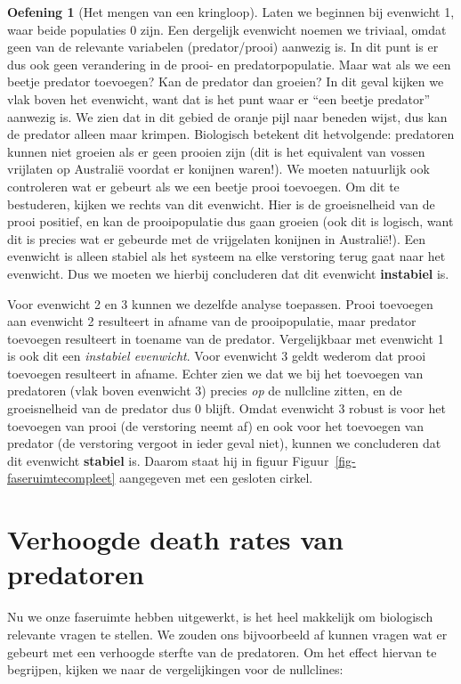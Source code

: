 \documentclass[
  a4paper,
]{scrbook}
\theoremstyle{definition}
\newtheorem{exercise}{Oefening}[chapter]
\theoremstyle{remark}
\begin{document}
\begin{exercise}[Het mengen van een
kringloop]
Laten we beginnen bij evenwicht 1, waar beide populaties 0 zijn. Een
dergelijk evenwicht noemen we triviaal, omdat geen van de relevante
variabelen (predator/prooi) aanwezig is. In dit punt is er dus ook geen
verandering in de prooi- en predatorpopulatie. Maar wat als we een
beetje predator toevoegen? Kan de predator dan groeien? In dit geval
kijken we vlak boven het evenwicht, want dat is het punt waar er ``een
beetje predator'' aanwezig is. We zien dat in dit gebied de oranje pijl
naar beneden wijst, dus kan de predator alleen maar krimpen. Biologisch
betekent dit hetvolgende: predatoren kunnen niet groeien als er geen
prooien zijn (dit is het equivalent van vossen vrijlaten op Australië
voordat er konijnen waren!). We moeten natuurlijk ook controleren wat er
gebeurt als we een beetje prooi toevoegen. Om dit te bestuderen, kijken
we rechts van dit evenwicht. Hier is de groeisnelheid van de prooi
positief, en kan de prooipopulatie dus gaan groeien (ook dit is logisch,
want dit is precies wat er gebeurde met de vrijgelaten konijnen in
Australië!). Een evenwicht is alleen stabiel als het systeem na elke
verstoring terug gaat naar het evenwicht. Dus we moeten we hierbij
concluderen dat dit evenwicht \textbf{instabiel} is.

Voor evenwicht 2 en 3 kunnen we dezelfde analyse toepassen. Prooi
toevoegen aan evenwicht 2 resulteert in afname van de prooipopulatie,
maar predator toevoegen resulteert in toename van de predator.
Vergelijkbaar met evenwicht 1 is ook dit een \emph{instabiel evenwicht}.
Voor evenwicht 3 geldt wederom dat prooi toevoegen resulteert in afname.
Echter zien we dat we bij het toevoegen van predatoren (vlak boven
evenwicht 3) precies \emph{op} de nullcline zitten, en de groeisnelheid
van de predator dus 0 blijft. Omdat evenwicht 3 robust is voor het
toevoegen van prooi (de verstoring neemt af) en ook voor het toevoegen
van predator (de verstoring vergoot in ieder geval niet), kunnen we
concluderen dat dit evenwicht \textbf{stabiel} is. Daarom staat hij in
figuur Figuur~\ref{fig-faseruimtecompleet} aangegeven met een gesloten
cirkel.

\section{Verhoogde death rates van
predatoren}\label{verhoogde-death-rates-van-predatoren}

Nu we onze faseruimte hebben uitgewerkt, is het heel makkelijk om
biologisch relevante vragen te stellen. We zouden ons bijvoorbeeld af
kunnen vragen wat er gebeurt met een verhoogde sterfte van de
predatoren. Om het effect hiervan te begrijpen, kijken we naar de
vergelijkingen voor de nullclines:


\end{exercise}
\end{document}
